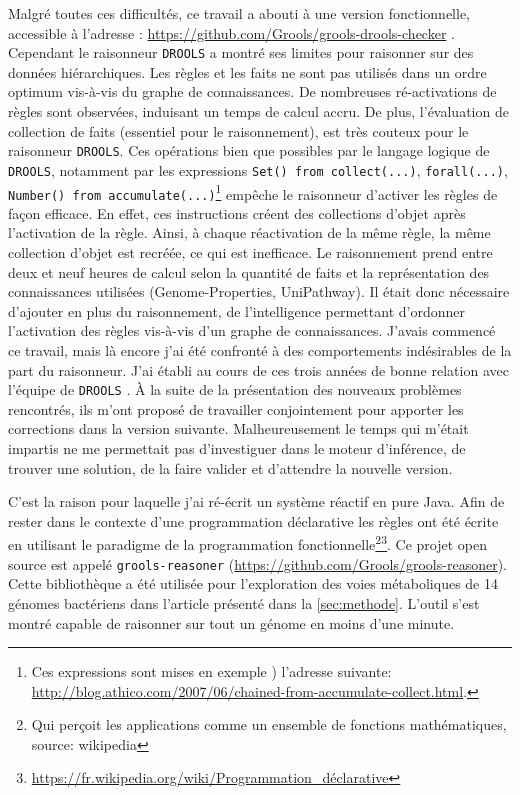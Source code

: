 \begin{refsegment}
Malgré toutes ces difficultés, ce travail a abouti à une version fonctionnelle, accessible à l'adresse : \url{https://github.com/Grools/grools-drools-checker} . Cependant le raisonneur \texttt{DROOLS} a montré ses limites pour raisonner sur des données hiérarchiques. Les règles et les faits ne sont pas utilisés dans un ordre optimum vis-à-vis du graphe de connaissances. De nombreuses ré-activations de règles sont observées, induisant un temps de calcul accru. De plus, l'évaluation de collection de faits (essentiel pour le raisonnement), est très couteux pour le raisonneur \texttt{DROOLS}. Ces opérations bien que  possibles par le langage logique de \texttt{DROOLS}, notamment par les expressions \lstinline[style=drl-style]$Set() from collect(...)$, \lstinline[style=drl-style]$forall(...)$, \lstinline[style=drl-style]$Number() from accumulate(...)$\footnote{Ces expressions sont mises en exemple ) l'adresse suivante: \url{http://blog.athico.com/2007/06/chained-from-accumulate-collect.html}.} empêche le raisonneur d'activer les règles de façon efficace. En effet, ces instructions créent des collections d'objet après l'activation de la règle. Ainsi, à chaque réactivation de la même règle, la même collection d'objet est recréée, ce qui est inefficace.  Le raisonnement prend entre deux et neuf heures de calcul selon la quantité de faits et la représentation des connaissances utilisées (Genome-Properties, UniPathway). Il était donc nécessaire d'ajouter en plus du raisonnement, de l'intelligence permettant d'ordonner l'activation des règles vis-à-vis d'un graphe de connaissances. J'avais commencé ce travail, mais là encore j'ai été confronté à des comportements indésirables de la part du raisonneur. J'ai établi au cours de ces trois années de bonne relation avec l'équipe de \texttt{DROOLS} . À la suite de la présentation  des nouveaux problèmes rencontrés, ils m'ont proposé de travailler conjointement pour apporter les corrections dans la version suivante. Malheureusement le temps qui m'était impartis ne me permettait pas d'investiguer dans le moteur d'inférence, de trouver une solution, de la faire valider et d'attendre la nouvelle version.

C'est la raison pour laquelle j'ai ré-écrit un système réactif en pure Java. Afin de rester dans le contexte d'une programmation déclarative les règles ont été écrite en utilisant le paradigme de la programmation fonctionnelle\footnote{Qui perçoit les applications comme un ensemble de fonctions mathématiques, source: wikipedia}\footnote{\url{https://fr.wikipedia.org/wiki/Programmation_déclarative}}. Ce projet open source est appelé \texttt{grools-reasoner} (\url{https://github.com/Grools/grools-reasoner}). Cette bibliothèque a été utilisée pour l'exploration des voies métaboliques de 14 génomes bactériens dans l'article présenté dans la  \cref{sec:methode}. L'outil s'est montré capable de raisonner sur tout un génome en moins d'une minute.


\end{refsegment}
